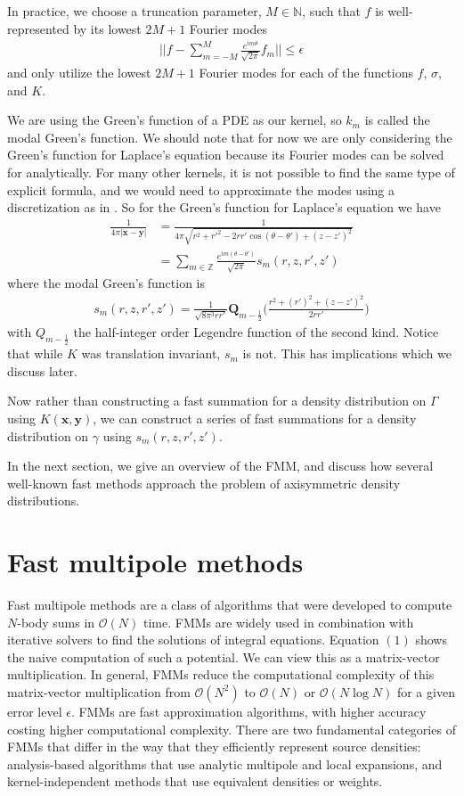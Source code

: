 \documentclass[11pt, oneside]{article}   	%
\begin{document}
In practice, we choose a truncation parameter, $M\in\mathbb{N}$, such that $f$ is well-represented by its lowest $2M+1$ Fourier modes
\begin{align}
||f-\sum\limits_{m=-M}^{M}\frac{e^{im\theta}}{\sqrt{2\pi}}f_m||\le\epsilon
\end{align}
and only utilize the lowest $2M+1$ Fourier modes for each of the functions $f$, $\sigma$, and $K$.

We are using the Green's function of a PDE as our kernel, so $k_m$ is called the modal Green's function. We should note that for now we are only considering the Green's function for Laplace's equation because its Fourier modes can be solved for analytically. For many other kernels, it is not possible to find the same type of explicit formula, and we would need to approximate the modes using a discretization as in \cite{YYM}. So for the Green's function for Laplace's equation we have
\begin{align}
\frac{1}{4\pi |\mathbf{x}-\mathbf{y}|} &=\frac{1}{4\pi\sqrt{r^2+r'^2-2rr'\cos{(\theta-\theta')}+(z-z')^2}}\\
&= \sum_{m\in\mathbb{Z}} \frac{e^{im(\theta-\theta')}}{\sqrt{2\pi}} s_m(r,z,r',z')
\end{align}
where the modal Green's function is
\begin{align}
s_m(r,z,r',z')=\frac{1}{\sqrt{8\pi^3 rr'}}\mathbf{Q}_{m-\frac{1}{2}}\bigg(\frac{r^2+(r')^2+(z-z')^2}{2rr'}\bigg)
\end{align}
with $Q_{m-\frac{1}{2}}$ the half-integer order Legendre function of the second kind. Notice that while $K$ was translation invariant, $s_m$ is not. This has implications which we discuss later.

Now rather than constructing a fast summation for a density distribution on $\Gamma$ using $K(\mathbf{x},\mathbf{y})$, we can construct a series of fast summations for a density distribution on $\gamma$ using $s_m(r,z,r',z')$.

In the next section, we give an overview of the FMM, and discuss how several well-known fast methods approach the problem of axisymmetric density distributions.

\section{Fast multipole methods}
Fast multipole methods are a class of algorithms that were developed to compute $N$-body sums in $\mathcal{O}(N)$ time. FMMs are widely used in combination with iterative solvers to find the solutions of integral equations. Equation $(1)$ shows the naive computation of such a potential. We can view this as a matrix-vector multiplication. In general, FMMs reduce the computational complexity of this matrix-vector multiplication from $\mathcal{O}(N^2)$ to $\mathcal{O}(N)$ or $\mathcal{O}(N\log N)$ for a given error level $\epsilon$. FMMs are fast approximation algorithms, with higher accuracy costing higher computational complexity. There are two fundamental categories of FMMs that differ in the way that they efficiently represent source densities: analysis-based algorithms that use analytic multipole and local expansions, and kernel-independent methods that use equivalent densities or weights.
\end{document}
